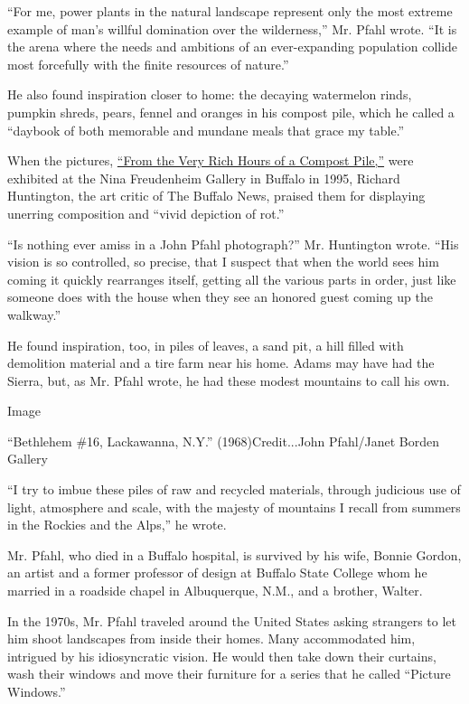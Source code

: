 ``For me, power plants in the natural landscape represent only the most
extreme example of man's willful domination over the wilderness,'' Mr.
Pfahl wrote. ``It is the arena where the needs and ambitions of an
ever-expanding population collide most forcefully with the finite
resources of nature.''

He also found inspiration closer to home: the decaying watermelon rinds,
pumpkin shreds, pears, fennel and oranges in his compost pile, which he
called a ``daybook of both memorable and mundane meals that grace my
table.''

When the pictures,
\href{https://www.albrightknox.org/artworks/p19954a-10392-very-rich-hours-compost-pile-pineapple}{``From
the Very Rich Hours of a Compost Pile,''} were exhibited at the Nina
Freudenheim Gallery in Buffalo in 1995, Richard Huntington, the art
critic of The Buffalo News, praised them for displaying unerring
composition and ``vivid depiction of rot.''

``Is nothing ever amiss in a John Pfahl photograph?'' Mr. Huntington
wrote. ``His vision is so controlled, so precise, that I suspect that
when the world sees him coming it quickly rearranges itself, getting all
the various parts in order, just like someone does with the house when
they see an honored guest coming up the walkway.''

He found inspiration, too, in piles of leaves, a sand pit, a hill filled
with demolition material and a tire farm near his home. Adams may have
had the Sierra, but, as Mr. Pfahl wrote, he had these modest mountains
to call his own.

Image

``Bethlehem \#16, Lackawanna, N.Y.'' (1968)Credit...John Pfahl/Janet
Borden Gallery

``I try to imbue these piles of raw and recycled materials, through
judicious use of light, atmosphere and scale, with the majesty of
mountains I recall from summers in the Rockies and the Alps,'' he wrote.

Mr. Pfahl, who died in a Buffalo hospital, is survived by his wife,
Bonnie Gordon, an artist and a former professor of design at Buffalo
State College whom he married in a roadside chapel in Albuquerque, N.M.,
and a brother, Walter.

In the 1970s, Mr. Pfahl traveled around the United States asking
strangers to let him shoot landscapes from inside their homes. Many
accommodated him, intrigued by his idiosyncratic vision. He would then
take down their curtains, wash their windows and move their furniture
for a series that he called ``Picture Windows.''

